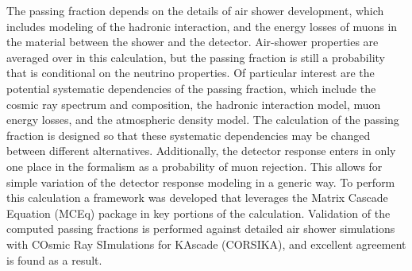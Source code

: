 The passing fraction depends on the details of air shower development, which includes modeling of the hadronic interaction, and the energy losses of muons in the material between the shower and the detector. 
Air-shower properties are averaged over in this calculation, but the passing fraction is still a probability that is conditional on the neutrino properties.
Of particular interest are the potential systematic dependencies of the passing fraction, which include the cosmic ray spectrum and composition, the hadronic interaction model, muon energy losses, and the atmospheric density model.
The calculation of the passing fraction is designed so that these systematic dependencies may be changed between different alternatives.
Additionally, the detector response enters in only one place in the formalism as a probability of muon rejection.
This allows for simple variation of the detector response modeling in a generic way.
To perform this calculation a framework was developed that leverages the Matrix Cascade Equation (MCEq) package in key portions of the calculation.
Validation of the computed passing fractions is performed against detailed air shower simulations with COsmic Ray SImulations for KAscade (CORSIKA), and excellent agreement is found as a result.

